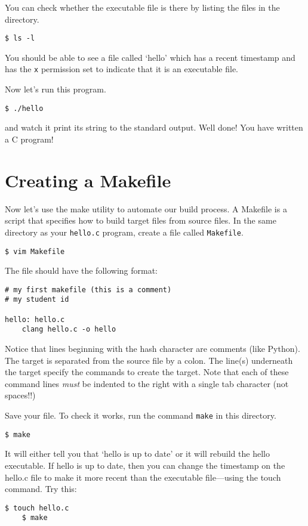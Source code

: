 \documentclass{article}
\begin{document}
You can check whether the executable file is there by listing the files in the directory.
\begin{lstlisting}[style=BashInputStyle]
    $ ls -l 
\end{lstlisting}
You should be able to see a file called `hello' which has a recent timestamp and has the \texttt{x} permission set to indicate that it is an executable file.

Now let's run this program. 
\begin{lstlisting}[style=BashInputStyle]
    $ ./hello
\end{lstlisting}
and watch it print its string to the standard output. Well done! You have written a C program!



\section*{Creating a Makefile}

Now let's use the make utility to automate our build process. A Makefile is a script that specifies how to build target files from source files.
In the same directory as your \texttt{hello.c} program, create a file called \texttt{Makefile}.
\begin{lstlisting}[style=BashInputStyle]
    $ vim Makefile
\end{lstlisting}

The file should have the following format:
\begin{lstlisting}[style=MakeProg]
# my first makefile (this is a comment)
# my student id 

hello: hello.c
    clang hello.c -o hello
\end{lstlisting}

Notice that lines beginning with the hash character are comments (like Python).
The target is separated from the source file by a colon. 
The line(s) underneath the target specify the commands to create the target. Note that each of these command lines \textit{must} be indented to the right with a single tab \keys{\tab} character (not spaces!!)

Save your file. To check it works, run the command \texttt{make} in this directory.
\begin{lstlisting}[style=BashInputStyle]
    $ make
\end{lstlisting}

It will either tell you that `hello is up to date' or it will rebuild the hello executable. If hello is up to date, then you can change the timestamp on the hello.c file to make it more recent than the executable file---using the touch command. Try this:
\begin{lstlisting}[style=BashInputStyle]
    $ touch hello.c
    $ make
\end{lstlisting}
\end{document}
